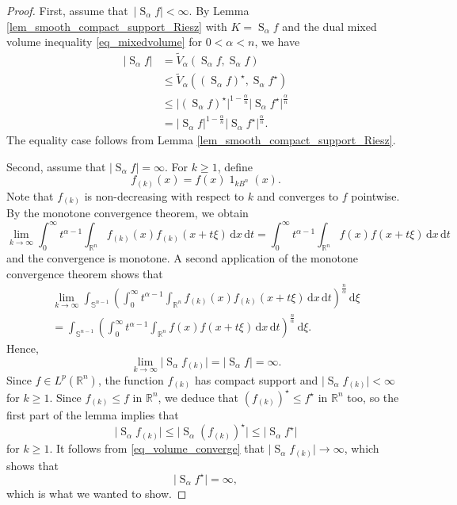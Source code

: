 \documentclass{amsart}
\newcommand{\R}{\mathbb R}
\newcommand{\B}{{B^n}}
\newcommand{\sn}{{\mathbb S}^{n-1}}
\renewcommand{\d}{\,\mathrm{d}}
\newcommand{\vol}[1]{\vert #1\vert}
\renewcommand{\chi}{\operatorname{1}}
\newcommand{\hls}[1]{\operatorname{S}_{#1}\!} %
\begin{document}
\begin{proof}
First, assume that $\,\vol{\hls \alpha f}<\infty$.  By Lemma \ref{lem_smooth_compact_support_Riesz} with $K=\hls \alpha f$ and the dual mixed volume inequality \eqref{eq_mixedvolume} for $0<\alpha<n$,  we have
\begin{align}
	\vol{\hls\alpha f}
	&= \tilde V_\alpha(\hls \alpha f, \hls\alpha f)\\ 
	&\leq \tilde V_\alpha((\hls\alpha f)^\star, \hls\alpha f^\star)\\
	&\leq \vol{(\hls\alpha f)^\star}^{1-\frac {\alpha}n} \vol{\hls\alpha f^\star}^{\frac \alpha n}\\
	&= \vol{\hls \alpha f}^{1-\frac {\alpha}n} \vol{\hls\alpha f^\star}^{\frac \alpha n}.
\end{align}
The equality case follows from Lemma \ref{lem_smooth_compact_support_Riesz}. 

\goodbreak
Second, assume that $\vol{\hls\alpha f} = \infty$. For $k\ge1$, define 
\[f_{(k)}(x) = f(x) \chi_{k \B}(x).
\]
Note that $f_{(k)}$ is non-decreasing with respect to $k$ and converges to $f$ pointwise. 
By the monotone convergence theorem, we obtain
\begin{equation}
\lim_{k\to\infty}\int_0^\infty t^{\alpha-1} \int_{\R^n} f_{(k)}(x)f_{(k)}(x+t \xi) \d x \d t= \int_0^\infty t^{\alpha-1} \int_{\R^n} f(x)f(x+t \xi) \d x \d t
\end{equation}
and the convergence is monotone. A second application of the monotone convergence theorem shows that
\begin{multline}
\lim_{k\to\infty}\int_{\sn} \left( \int_0^\infty t^{\alpha-1} \int_{\R^n} f_{(k)}(x)f_{(k)}(x+t \xi) \d x \d t \right)^{\frac n\alpha} \d\xi \\= \int_{\sn} \left( \int_0^\infty t^{\alpha-1} \int_{\R^n} f(x)f(x+t \xi) \d x \d t\right)^{\frac n\alpha} \d\xi. 
\end{multline}
Hence,
\begin{equation}\label{eq_volume_converge}
\lim_{k\to\infty}\vol{\hls \alpha f_{(k)}} = \vol{\hls \alpha f} = \infty.
\end{equation}
Since $f\in L^p(\R^n)$, the function $f_{(k)}$ has compact support and $\vol{\hls \alpha f_{(k)}}<\infty$ for $k\ge 1$.
Since $f_{(k)} \leq f$ in $\R^n$, we deduce that $(f_{(k)})^\star \leq f^\star$ in $\R^n$ too, so the first part of the lemma implies that
\begin{equation}
\vol{\hls\alpha f_{(k)}} \leq \vol{\hls\alpha (f_{(k)})^\star} \leq \vol{\hls\alpha f^\star} 
\end{equation}
for $k\ge 1$.
It follows from \eqref{eq_volume_converge} that
 $\vol{\hls \alpha f_{(k)}} \to \infty$, which shows that
		\begin{equation}
		\vol{\hls\alpha f^\star} = \infty,
		\end{equation}
which is what we wanted to show.
\end{proof}
\end{document}

